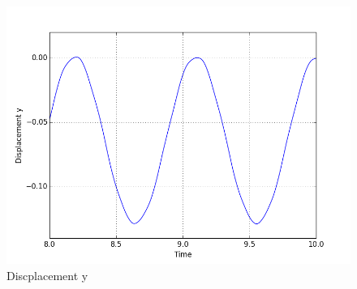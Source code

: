 \begin{figure}[H]
\begin{minipage}[b]{0.5\linewidth}
    \centering
    \includegraphics[width=.75\linewidth]{./Verification_Validation/Hron_Turek/dis_y_short.png} 
    \caption{Discplacement y} 
    \vspace{4ex}
  \end{minipage} 
\end{figure}
